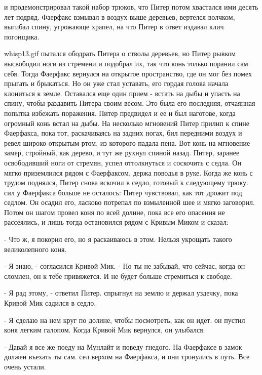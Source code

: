 и продемонстрировал такой набор трюков, что Питер потом хвастался ими 
десять лет подряд. Фаерфакс взмывал в воздух выше деревьев, вертелся 
волчком, выгибал спину, угрожающе храпел, на что Питер в ответ издавал 
клич погонщика.
\par{whisp13.gif}
 пытался ободрать Питера о стволы деревьев, но Питер 
рывком высвободил ноги из стремени и подобрал их, так что конь только 
поранил сам себя. Тогда Фаерфакс вернулся на открытое пространство, 
где он мог без помех прыгать и брыкаться. Но он уже стал уставать, его 
гордая голова начала клониться к земле. Оставался еще один прием - 
встать на дыбы и упасть на спину, чтобы раздавить Питера своим весом. 
Это была его последняя, отчаянная попытка избежать поражения.
 Питер предвидел и ее и был наготове, когда огромный конь встал 
на дыбы. На несколько мгновений Питер прилип к спине Фаерфакса, пока 
тот, раскачиваясь на задних ногах, бил передними воздух и ревел широко 
открытым ртом, из которого падала пена. Вот конь на мгновение замер, 
стройный, как дерево, и тут же рухнул спиной назад. Питер, заранее 
освободивший ноги от стремян, успел оттолкнуться и соскочить с седла. 
Он мягко приземлился рядом с Фаерфаксом, держа поводья в руке. Когда 
же конь с трудом поднялся, Питер снова вскочил в седло, готовый к 
следующему трюку.
 сил у Фаерфакса больше не осталось: Питер чувствовал, как тот 
дрожит под седлом. Он осадил его, ласково потрепал по взмыленной шее и 
мягко заговорил. Потом он шагом провел коня по всей долине, пока все 
его опасения не рассеялись, и лишь тогда остановился рядом с Кривым 
Миком и сказал:
\par- Что ж, я покорил его, но я раскаиваюсь в этом. Нельзя укрощать 
такого великолепного коня.
\par- Я знаю, - согласился Кривой Мик. - Но ты не забывай, что сейчас, 
когда он сломлен, он к тебе привяжется. И не будет больше стремиться к 
свободе.
\par- Я рад этому, - ответил Питер.
 спрыгнул на землю и держал уздечку, пока Кривой Мик садился в 
седло.
\par- Я сделаю на нем круг по долине, чтобы посмотреть, как он идет.
 он пустил коня легким галопом. Когда Кривой Мик вернулся, он 
улыбался.
\par- Давай я все же поеду на Мунлайт и поведу гнедого. На Фаерфаксе в 
замок должен въехать ты сам.
 сел верхом на Фаерфакса, и они тронулись в путь. Все очень 
устали.
